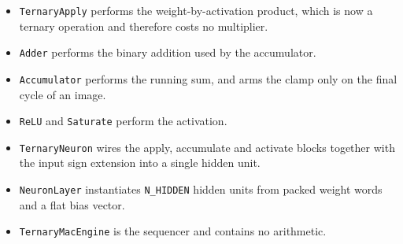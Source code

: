 \documentclass[11pt,a4paper]{article}
\begin{document}
\begin{itemize}[leftmargin=*]
  \item \texttt{TernaryApply} performs the weight-by-activation product, which
    is now a ternary operation and therefore costs no multiplier.
  \item \texttt{Adder} performs the binary addition used by the accumulator.
  \item \texttt{Accumulator} performs the running sum, and arms the clamp only on
    the final cycle of an image.
  \item \texttt{ReLU} and \texttt{Saturate} perform the activation.
  \item \texttt{TernaryNeuron} wires the apply, accumulate and activate blocks
    together with the input sign extension into a single hidden unit.
  \item \texttt{NeuronLayer} instantiates \texttt{N\_HIDDEN} hidden units from
    packed weight words and a flat bias vector.
  \item \texttt{TernaryMacEngine} is the sequencer and contains no arithmetic.
\end{itemize}
\end{document}
